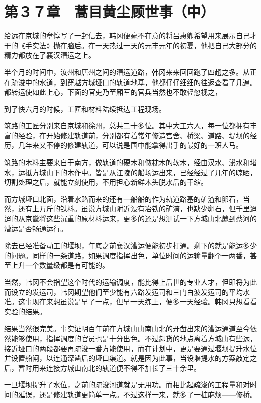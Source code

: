 \section{第３７章　蒿目黄尘顾世事（中）}

给远在京城的章惇写了一封信去，韩冈便毫不在意的将吕惠卿希望用来展示自己才干的《手实法》抛在脑后。在一天热过一天的元丰元年的初夏，他把自己大部分的精力都放在了襄汉漕运之上。

半个月的时间中，汝州和唐州之间的漕运道路，韩冈来来回回跑了四趟之多。从正在疏浚中的水道，到穿越方城垭口的轨道地基，他都仔仔细细的往返查看了几遍。都转运使如此上心，下面的官吏乃至厢军的官兵当然也不敢轻忽视之，

到了快六月的时候，工匠和材料陆续抵达工程现场。

筑路的工匠分别来自京城和徐州，总共二十多位。其中大工六人，每一位都拥有丰富的经验，在开始修建轨道前，分别都有着常年修造宫舍、桥梁、道路、堤坝的经历，几年来又不停的修建轨道，可以说是国中能拿得出手的最好的一班人马。

筑路的木料主要来自于南方，做轨道的硬木和做枕木的软木，经由汉水、泌水和堵水，运抵方城山下的木作中。皆是从江陵的船场运出来，已经经过了几年的晾晒，切割处理之后，就能立刻使用，不用担心新鲜木头脱水后的干缩。

而方城垭口北面，沿着水路而来的还有一船船的作为轨道路基的矿渣和卵石，当然，还有上万斤的铁料。虽说方城山附近没有冶铁的矿渣，也缺少卵石，但千里迢迢的从京畿将这些沉重的原材料运来，更多的还是想测试一下方城山北麓到蔡河的漕运是否畅通运行。

除去已经准备动工的堰坝，年底之前襄汉漕运便能初步打通。剩下的就是能运多少的问题。同样的一条道路，如果调度指挥出色，单位时间的运输量翻个一两番，甚至上升一个数量级都是有可能的。

当然，韩冈不会指望这个时代的运输调度，能比得上后世的专业人才，但即将为此而设立的发运司，韩冈期望他们至少能有六路发运司和三门白波发运司的平均水准。这事现在来想虽说是早了一点，但早一天练上，便多一天经验。韩冈只想看看实验的结果。

结果当然很完美。事实证明百年前在方城山山南山北的开凿出来的漕运通道至今依然能够使用，指挥调度的官员也是十分出色。不过卸货的地点离着方城山有些远，接近垭口的两段都要再疏浚一番方能使用，而在计划中，更是要通过堰坝提升水位并设置船闸，以连通深凿后的垭口渠道。就是因为此事，当设堰提水的方案敲定之后，暂时用来连接方城山南北的轨道便不得不加长了三十余里。

一旦堰坝提升了水位，之前的疏浚河道就是无用功。而相比起疏浚的工程量和对时间的延误，还是修建轨道更简单一点。不过这样一来，就多了一桩麻烦——修桥。

